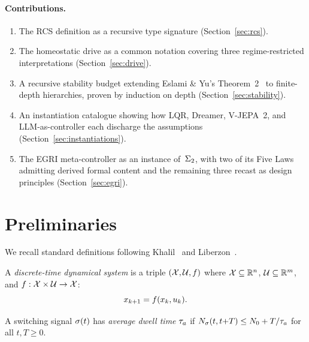 \documentclass[conference]{IEEEtran}
\begin{document}
\paragraph{Contributions.}
\begin{enumerate}
  \item The RCS definition as a recursive type signature
        (Section~\ref{sec:rcs}).
  \item The homeostatic drive as a common notation covering three
        regime-restricted interpretations (Section~\ref{sec:drive}).
  \item A recursive stability budget extending Eslami \& Yu's
        Theorem~2~\cite{eslami2026control} to finite-depth hierarchies,
        proven by induction on depth (Section~\ref{sec:stability}).
  \item An instantiation catalogue showing how LQR, Dreamer, V-JEPA~2,
        and LLM-as-controller each discharge the assumptions
        (Section~\ref{sec:instantiations}).
  \item The EGRI meta-controller as an instance of~$\Sigma_2$, with two
        of its Five Laws admitting derived formal content and the
        remaining three recast as design principles
        (Section~\ref{sec:egri}).
\end{enumerate}

\section{Preliminaries}
\label{sec:prelim}

We recall standard definitions following
Khalil~\cite{khalil2002nonlinear} and
Liberzon~\cite{liberzon2003switching}.

\begin{definition}
A \emph{discrete-time dynamical system} is a triple $(\mathcal{X}, \mathcal{U}, f)$ where
$\mathcal{X} \subseteq \mathbb{R}^n$, $\mathcal{U} \subseteq \mathbb{R}^m$, and
$f : \mathcal{X} \times \mathcal{U} \to \mathcal{X}$:
\begin{equation}
  x_{k+1} = f(x_k, u_k).
\end{equation}
\end{definition}

\begin{definition}
\label{def:dwell-time}
A switching signal $\sigma(t)$ has \emph{average dwell time} $\taua$ if
$N_\mode(t, t{+}T) \leq N_0 + T/\taua$ for all $t, T \geq 0$.
\end{definition}
\end{document}
